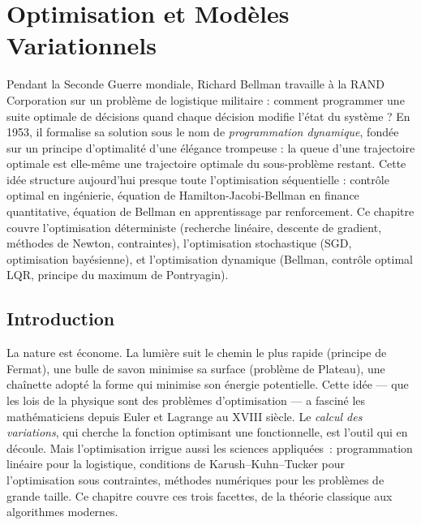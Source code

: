 \chapter{Optimisation et Mod\`eles Variationnels}
\label{ch:optimisation}

Pendant la Seconde Guerre mondiale, Richard Bellman travaille à la RAND Corporation sur un problème de logistique militaire : comment programmer une suite optimale de décisions quand chaque décision modifie l'état du système ? En 1953, il formalise sa solution sous le nom de \emph{programmation dynamique}, fondée sur un principe d'optimalité d'une élégance trompeuse : la queue d'une trajectoire optimale est elle-même une trajectoire optimale du sous-problème restant. Cette idée structure aujourd'hui presque toute l'optimisation séquentielle : contrôle optimal en ingénierie, équation de Hamilton-Jacobi-Bellman en finance quantitative, équation de Bellman en apprentissage par renforcement. Ce chapitre couvre l'optimisation déterministe (recherche linéaire, descente de gradient, méthodes de Newton, contraintes), l'optimisation stochastique (SGD, optimisation bayésienne), et l'optimisation dynamique (Bellman, contrôle optimal LQR, principe du maximum de Pontryagin).

\section{Introduction}

La nature est \'econome. La lumi\`ere suit le chemin le plus rapide (principe de Fermat), une bulle de savon minimise sa surface (probl\`eme de Plateau), une cha\^inette adopt\'e la forme qui minimise son \'energie potentielle. Cette id\'ee --- que les lois de la physique sont des probl\`emes d'optimisation --- a fascin\'e les math\'ematiciens depuis Euler et Lagrange au XVIII\ieme{} si\`ecle. Le \emph{calcul des variations}, qui cherche la fonction optimisant une fonctionnelle, est l'outil qui en d\'ecoule. Mais l'optimisation irrigue aussi les sciences appliqu\'ees~: programmation lin\'eaire pour la logistique, conditions de Karush--Kuhn--Tucker pour l'optimisation sous contraintes, m\'ethodes num\'eriques pour les probl\`emes de grande taille. Ce chapitre couvre ces trois facettes, de la th\'eorie classique aux algorithmes modernes.

